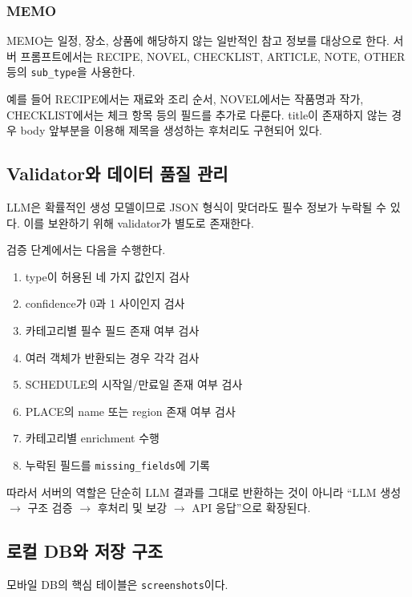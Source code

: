 \documentclass[11pt,a4paper]{article}
\begin{document}
\subsubsection{MEMO}

MEMO는 일정, 장소, 상품에 해당하지 않는 일반적인 참고 정보를 대상으로 한다. 서버 프롬프트에서는 RECIPE, NOVEL, CHECKLIST, ARTICLE, NOTE, OTHER 등의 \texttt{sub\_type}을 사용한다.

예를 들어 RECIPE에서는 재료와 조리 순서, NOVEL에서는 작품명과 작가, CHECKLIST에서는 체크 항목 등의 필드를 추가로 다룬다. title이 존재하지 않는 경우 body 앞부분을 이용해 제목을 생성하는 후처리도 구현되어 있다.

\subsection{Validator와 데이터 품질 관리}

LLM은 확률적인 생성 모델이므로 JSON 형식이 맞더라도 필수 정보가 누락될 수 있다. 이를 보완하기 위해 validator가 별도로 존재한다.

검증 단계에서는 다음을 수행한다.

\begin{enumerate}
    \item type이 허용된 네 가지 값인지 검사
    \item confidence가 0과 1 사이인지 검사
    \item 카테고리별 필수 필드 존재 여부 검사
    \item 여러 객체가 반환되는 경우 각각 검사
    \item SCHEDULE의 시작일/만료일 존재 여부 검사
    \item PLACE의 name 또는 region 존재 여부 검사
    \item 카테고리별 enrichment 수행
    \item 누락된 필드를 \texttt{missing\_fields}에 기록
\end{enumerate}

따라서 서버의 역할은 단순히 LLM 결과를 그대로 반환하는 것이 아니라 ``LLM 생성 $\rightarrow$ 구조 검증 $\rightarrow$ 후처리 및 보강 $\rightarrow$ API 응답''으로 확장된다.

\subsection{로컬 DB와 저장 구조}

모바일 DB의 핵심 테이블은 \texttt{screenshots}이다.
\end{document}

